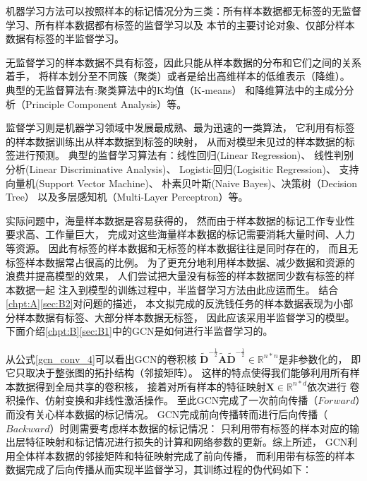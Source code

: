   机器学习方法可以按照样本的标记情况分为三类：所有样本数据都无标签的无监督学习、所有样本数据都有标签的监督学习以及
  本节的主要讨论对象、仅部分样本数据有标签的半监督学习。

  无监督学习的样本数据不具有标签，因此只能从样本数据的分布和它们之间的关系着手，
  将样本划分至不同簇（聚类）或者是给出高维样本的低维表示（降维）。
  典型的无监督算法有:聚类算法中的K均值（K-means）
  和降维算法中的主成分分析（Principle Component Analysis）等。

  监督学习则是机器学习领域中发展最成熟、最为迅速的一类算法，
  它利用有标签的样本数据训练出从样本数据到标签的映射，
  从而对模型未见过的样本数据的标签进行预测。
  典型的监督学习算法有：线性回归(Linear Regression)、
  线性判别分析(Linear Discriminative Analysis)、
  Logistic回归(Logisitic Regression)、
  支持向量机(Support Vector Machine)、
  朴素贝叶斯(Naive Bayes)、决策树（Decision Tree）
  以及多层感知机（Multi-Layer Perceptron）等。

  实际问题中，海量样本数据是容易获得的，
  然而由于样本数据的标记工作专业性要求高、工作量巨大，
  完成对这些海量样本数据的标记需要消耗大量时间、人力等资源。
  因此有标签的样本数据和无标签的样本数据往往是同时存在的，
  而且无标签样本数据常占很高的比例。
  为了更充分地利用样本数据、减少数据和资源的浪费并提高模型的效果，
  人们尝试把大量没有标签的样本数据同少数有标签的样本数据一起
  注入到模型的训练过程中，半监督学习方法由此应运而生。
  结合\ref{chpt:A}\ref{sec:B2}对问题的描述，
  本文拟完成的反洗钱任务的样本数据表现为小部分样本数据有标签、大部分样本数据无标签，
  因此应该采用半监督学习的模型。
  下面介绍\ref{chpt:B}\ref{sec:B1}中的GCN是如何进行半监督学习的。

  从公式\ref{gcn_conv_4}可以看出GCN的卷积核
  $\tilde{\mathbf{D}}^{-\frac{1}{2}} \tilde{\mathbf{A}} \tilde{\mathbf{D}}^{-\frac{1}{2}} \in \mathbb{R}^{n*n}$是非参数化的，
  即它只取决于整张图的拓扑结构（邻接矩阵）。
  这样的特点使得我们能够利用所有样本数据得到全局共享的卷积核，
  接着对所有样本的特征映射$\mathbf{X} \in \mathbb{R}^{n*d}$依次进行
  卷积操作、仿射变换和非线性激活操作。
  至此GCN完成了一次前向传播（$Forward$）而没有关心样本数据的标记情况。
  GCN完成前向传播转而进行后向传播（$Backward$）时则需要考虑样本数据的标记情况：
  只利用带有标签的样本对应的输出层特征映射和标记情况进行损失的计算和网络参数的更新。综上所述，
  GCN利用全体样本数据的邻接矩阵和特征映射完成了前向传播，
  而利用带有标签的样本数据完成了后向传播从而实现半监督学习，其训练过程的伪代码如下：

